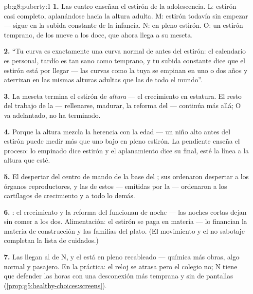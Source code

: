 \begin{solution}{pb:g8:puberty:1}
\textbf{1.} Las cuatro enseñan el estirón de la adolescencia. L:
estirón casi completo, aplanándose hacia la altura adulta. M: estirón
todavía sin empezar --- sigue en la subida constante de la infancia.
N: en pleno estirón. O: un estirón temprano, de los nueve a los doce,
que ahora llega a su meseta.

\textbf{2.} ``Tu curva es exactamente una curva normal de antes del
estirón: el calendario es personal, tardío es tan sano como temprano, y
tu subida constante dice que el estirón está por llegar --- las curvas
como la tuya se empinan en uno o dos años y aterrizan en las mismas
alturas adultas que las de todo el mundo''.

\textbf{3.} La meseta termina el estirón de \emph{altura} --- el
crecimiento en estatura. El resto del trabajo de la  ---
rellenarse, madurar, la reforma del  --- continúa más allá; O va
adelantado, no ha terminado.

\textbf{4.} Porque la altura mezcla la herencia con la edad --- un niño
alto antes del estirón puede medir más que uno bajo en pleno estirón.
La pendiente enseña el proceso: lo empinado dice estirón y el
aplanamiento dice su final, esté la línea a la altura que esté.

\textbf{5.} El despertar del centro de mando de la base del ;
sus  ordenaron despertar a los órganos reproductores, y las
 de estos --- emitidas por la  --- ordenaron a los
cartílagos de crecimiento y a todo lo demás.

\textbf{6.} : el crecimiento y la reforma del  funcionan de
noche --- las noches cortas dejan sin comer a los dos. Alimentación: el
estirón se paga en materia --- lo financian la materia de construcción
y las familias del plato. (El movimiento y el no sabotaje completan la
lista de cuidados.)

\textbf{7.} Las  llegan al  de N, y el  está en
pleno recableado --- química más obras, algo normal y pasajero.
En la práctica: el reloj se atrasa pero el colegio no; N tiene que
defender las horas con una desconexión más temprana y sin  de
pantallas (\cref{prop:g5:healthy-choices:screens}).


\end{solution}

